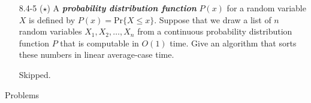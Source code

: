 \begin{enumerate}
\begin{framed}
\end{framed}

\item[8.4-5]{($\star$) A \textbf{\emph{probability distribution function}}
$P(x)$ for a random variable $X$ is defined by $P(x) = \text{Pr}\{X \le x\}$.
Suppose that we draw a list of $n$ random variables $X_1, X_2, \dots, X_n$ from
a continuous probability distribution function $P$ that is computable in $O(1)$
time. Give an algorithm that sorts these numbers in linear average-case time.}

\begin{framed}
Skipped.
\end{framed}

\end{enumerate}

\newpage

{\large Problems}

